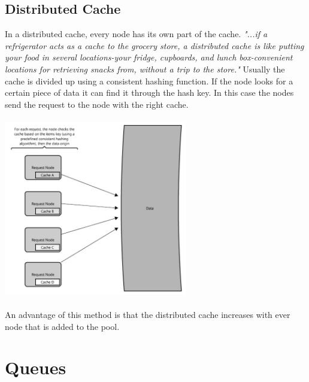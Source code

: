 \documentclass[12p]{article}
\begin{document}
	\subsection{Distributed Cache}
	In a distributed cache, every node has its own part of the cache. \textit{"...if a refrigerator acts as a cache to the grocery store, a distributed cache is like putting your food in several locations-your fridge, cupboards, and lunch box-convenient locations for retrieving snacks from, without a trip to the store."}\cite{cache} Usually the cache is divided up using a consistent hashing function. If the node looks for a certain piece of data it can find it through the hash key. In this case the nodes send the request to the node with the right cache.\\\\
	 \includegraphics[width=0.6\textwidth]{img/distrib} \cite{cache} \\\\
	An advantage of this method is that the distributed cache increases with ever node that is added to the pool.
	
	\newpage
	\section{Queues}
	
\end{document}
